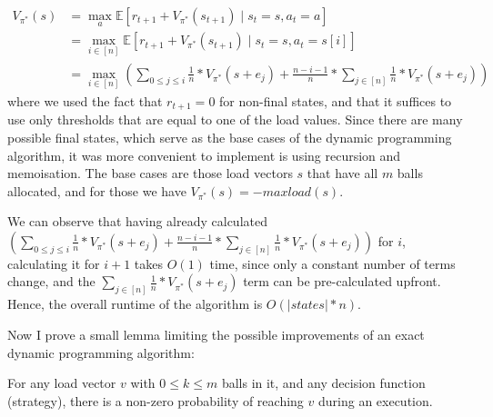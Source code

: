 \begin{equation} \label{eq:twothinning-dynamicprogramming}
\begin{split}
    V_{\pi^*}(s) &= \max_a \mathbb{E} [r_{t+1} + V_{\pi^*}(s_{t+1}) \mid s_t=s, a_t=a] \\
    &= \max_{i \in [n]} \mathbb{E} [r_{t+1} + V_{\pi^*}(s_{t+1}) \mid s_t=s, a_t=s[i]] \\
    &= \max_{i \in [n]} (\sum_{0\leq j \leq i} \frac{1}{n}*V_{\pi^*}(s+e_j) + \frac{n-i-1}{n} * \sum_{j \in [n]} \frac{1}{n}*V_{\pi^*}(s+e_j))
\end{split}
\end{equation}
where we used the fact that $r_{t+1}=0$ for non-final states, and that it suffices to use only thresholds that are equal to one of the load values. Since there are many possible final states, which serve as the base cases of the dynamic programming algorithm, it was more convenient to implement is using recursion and memoisation. The base cases are those load vectors $s$ that have all $m$ balls allocated, and for those we have $V_{\pi^*}(s)=-maxload(s)$. 


We can observe that having already calculated $(\sum_{0\leq j \leq i} \frac{1}{n}*V_{\pi^*}(s+e_j) + \frac{n-i-1}{n} * \sum_{j \in [n]} \frac{1}{n}*V_{\pi^*}(s+e_j))$ for $i$, calculating it for $i+1$ takes $O(1)$ time, since only a constant number of terms change, and the $\sum_{j \in [n]} \frac{1}{n}*V_{\pi^*}(s+e_j)$ term can be pre-calculated upfront. Hence, the overall runtime of the algorithm is $O(|states|*n)$.\


Now I prove a small lemma limiting the possible improvements of an exact dynamic programming algorithm:


\begin{lemma} \label{lemma: everystatereachable}
For any load vector $v$ with $0\leq k\leq m$ balls in it, and any decision function (strategy), there is a non-zero probability of reaching $v$ during an execution.
\end{lemma}

